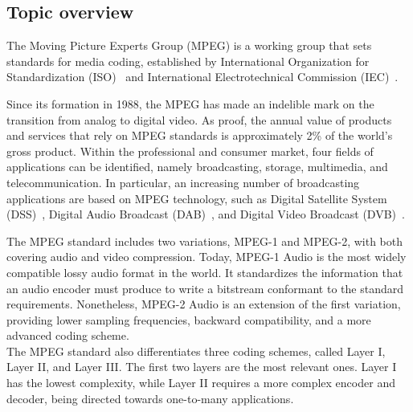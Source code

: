 
\subsection{Topic overview}
The Moving Picture Experts Group (MPEG) is a working group that sets standards for media coding, established by International Organization for Standardization (ISO)~\cite{iso} and International Electrotechnical Commission (IEC)~\cite{iec}.

Since its formation in 1988, the MPEG has made an indelible mark on the transition from analog to digital video. As proof, the annual value of products and services that rely on MPEG standards is approximately 2\% of the world's gross product.
Within the professional and consumer market, four fields of applications can be identified, namely broadcasting, storage, multimedia, and telecommunication. In particular, an increasing number of broadcasting applications are based on MPEG technology, such as Digital Satellite System (DSS)~\cite{dss}, Digital Audio Broadcast (DAB)~\cite{dab}, and Digital Video Broadcast (DVB)~\cite{dvb}.

The MPEG standard includes two variations, MPEG-1 and MPEG-2, with both covering audio and video compression.
Today, MPEG-1 Audio is the most widely compatible lossy audio format in the world. It standardizes the information that an audio encoder must produce to write a bitstream conformant to the standard requirements. 
Nonetheless, MPEG-2 Audio is an extension of the first variation, providing lower sampling frequencies, backward compatibility, and a more advanced coding scheme.\\
The MPEG standard also differentiates three coding schemes, called Layer I, Layer II, and Layer III.
The first two layers are the most relevant ones. Layer I has the lowest complexity, while Layer II requires a more complex encoder and decoder, being directed towards one-to-many applications.

